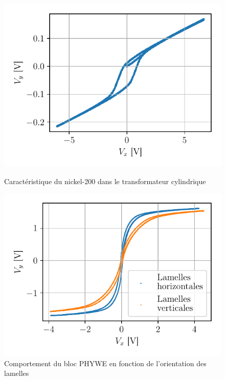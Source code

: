 \begin{figure}[h]
    \begin{minipage}{0.48\linewidth}
        \centering
        \includegraphics[width=\linewidth]{figures/G1-cylindre-nickel200.pdf}
        \caption{Caractéristique du nickel-200 dans le transformateur cylindrique}
        \label{fig:nickel-200}
    \end{minipage}
    \hfill
    \begin{minipage}{0.48\linewidth}
        \centering
        \includegraphics[width=\linewidth]{figures/vertical_vs_horizontal.pdf}
        \caption{Comportement du bloc PHYWE en fonction de l'orientation des lamelles}
        \label{fig:orientation_bloc}
    \end{minipage}
\end{figure}

